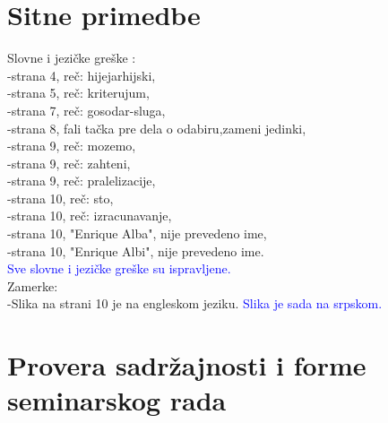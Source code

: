 \documentclass[a4paper]{report}
\newcommand{\odgovor}[1]{\textcolor{blue}{#1}}
\begin{document}
\section{Sitne primedbe}
Slovne i jezičke greške : \\
-strana 4, reč: hijejarhijski,\\
 -strana 5, reč: kriterujum,\\
 -strana 7, reč: gosodar-sluga,\\
 -strana 8, fali tačka pre dela o odabiru,zameni jedinki, \\
 -strana 9, reč: mozemo,\\
 -strana 9, reč: zahteni,\\
 -strana 9, reč: pralelizacije, \\
 -strana 10, reč: sto, \\
 -strana 10, reč: izracunavanje, \\
-strana 10, "Enrique Alba", nije prevedeno ime,\\
-strana 10, "Enrique Albi", nije prevedeno ime.\\
\odgovor{Sve slovne i jezičke greške su ispravljene.}\\
Zamerke: \\
-Slika na strani 10 je na engleskom jeziku. 
\odgovor{Slika je sada na srpskom.}
\section{Provera sadržajnosti i forme seminarskog rada}
\end{document}
